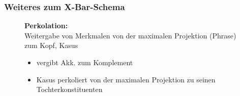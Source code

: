 \begin{frame}
\frametitle{Weiteres zum X-Bar-Schema}

\begin{figure}[b]

  	\begin{minipage}[b]{0.45\textwidth}
	\textbf{Perkolation:}\\
	 Weitergabe von Merkmalen von der maximalen Projektion (Phrase) zum Kopf, \zB Kasus
	 \begin{itemize}
	 	\item {} vergibt Akk. zum Komplement
	 	\item Kasus perkoliert von der maximalen Projektion zu seinen Tochterkonstituenten
	 \end{itemize}
  	\end{minipage}  
	\begin{minipage}[b]{0.5\textwidth}
	\centering
  	\end{minipage}  
\end{figure}

\end{frame}


